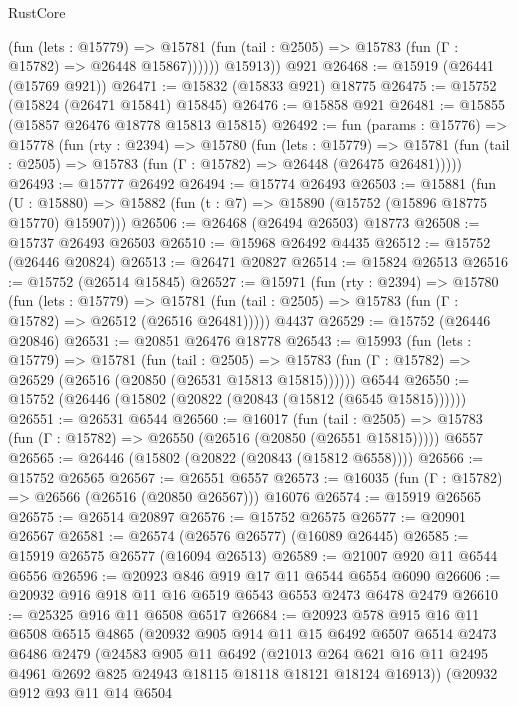 \begin{lexlean}{RustCore}
\begin{coremodule}
              (fun (lets : @15779) =>
              @15781 (fun (tail : @2505) => @15783 (fun (Γ : @15782) => @26448 @15867))))))
        @15913))
    @921
@26468 := @15919 (@26441 (@15769 @921))
@26471 := @15832 (@15833 @921) @18775
@26475 := @15752 (@15824 (@26471 @15841) @15845)
@26476 := @15858 @921
@26481 := @15855 (@15857 @26476 @18778 @15813 @15815)
@26492 := fun (params : @15776) =>
  @15778
    (fun (rty : @2394) =>
    @15780
      (fun (lets : @15779) =>
      @15781 (fun (tail : @2505) => @15783 (fun (Γ : @15782) => @26448 (@26475 @26481)))))
@26493 := @15777 @26492
@26494 := @15774 @26493
@26503 := @15881
    (fun (U : @15880) => @15882 (fun (t : @7) => @15890 (@15752 (@15896 @18775 @15770) @15907)))
@26506 := @26468 (@26494 @26503) @18773
@26508 := @15737 @26493 @26503
@26510 := @15968 @26492 @4435
@26512 := @15752 (@26446 @20824)
@26513 := @26471 @20827
@26514 := @15824 @26513
@26516 := @15752 (@26514 @15845)
@26527 := @15971
    (fun (rty : @2394) =>
    @15780
      (fun (lets : @15779) =>
      @15781 (fun (tail : @2505) => @15783 (fun (Γ : @15782) => @26512 (@26516 @26481)))))
    @4437
@26529 := @15752 (@26446 @20846)
@26531 := @20851 @26476 @18778
@26543 := @15993
    (fun (lets : @15779) =>
    @15781
      (fun (tail : @2505) =>
      @15783 (fun (Γ : @15782) => @26529 (@26516 (@20850 (@26531 @15813 @15815))))))
    @6544
@26550 := @15752 (@26446 (@15802 (@20822 (@20843 (@15812 (@6545 @15815))))))
@26551 := @26531 @6544
@26560 := @16017
    (fun (tail : @2505) => @15783 (fun (Γ : @15782) => @26550 (@26516 (@20850 (@26551 @15815)))))
    @6557
@26565 := @26446 (@15802 (@20822 (@20843 (@15812 @6558))))
@26566 := @15752 @26565
@26567 := @26551 @6557
@26573 := @16035 (fun (Γ : @15782) => @26566 (@26516 (@20850 @26567))) @16076
@26574 := @15919 @26565
@26575 := @26514 @20897
@26576 := @15752 @26575
@26577 := @20901 @26567
@26581 := @26574 (@26576 @26577) (@16089 @26445)
@26585 := @15919 @26575 @26577 (@16094 @26513)
@26589 := @21007 @920 @11 @6544 @6556
@26596 := @20923 @846 @919 @17 @11 @6544 @6554 @6090
@26606 := @20932 @916 @918 @11 @16 @6519 @6543 @6553 @2473 @6478 @2479
@26610 := @25325 @916 @11 @6508 @6517
@26684 := @20923
    @578
    @915
    @16
    @11
    @6508
    @6515
    @4865
    (@20932
      @905
      @914
      @11
      @15
      @6492
      @6507
      @6514
      @2473
      @6486
      @2479
      (@24583
        @905
        @11
        @6492
        (@21013 @264 @621 @16 @11 @2495 @4961 @2692 @825 @24943 @18115 @18118 @18121 @18124 @16913))
      (@20932
        @912
        @93
        @11
        @14
        @6504

\end{coremodule}
\end{lexlean}
